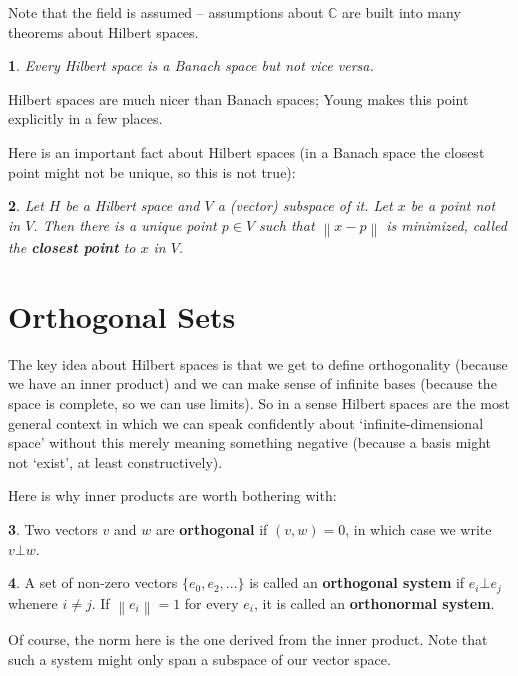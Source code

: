 \documentclass[oneside,english]{amsbook}
\numberwithin{section}{chapter}
\theoremstyle{plain}
\newtheorem{thm}{\protect\theoremname}
\theoremstyle{definition}
\newtheorem{defn}[thm]{\protect\definitionname}
\newcommand{\norm}[1]{\left\lVert#1\right\rVert}
\providecommand{\definitionname}{Definition}
\providecommand{\theoremname}{Theorem}
\begin{document}
Note that the field is assumed -- assumptions about $\mathbb{C}$ are built into many theorems about Hilbert spaces.

\begin{thm}
	Every Hilbert space is a Banach space but not \emph{vice versa}.
\end{thm}

Hilbert spaces are much nicer than Banach spaces; Young makes this point explicitly in a few places.

Here is an important fact about Hilbert spaces (in a Banach space the closest point might not be unique, so this is not true):

\begin{thm}
	Let $H$ be a Hilbert space and $V$ a (vector) subspace of it. Let $x$ be a point not in $V$. Then there is a unique point $p\in V$ such that $\norm{x - p}$ is minimized, called the \textbf{closest point} to $x$ in $V$.
\end{thm}

\section{Orthogonal Sets}

The key idea about Hilbert spaces is that we get to define orthogonality (because we have an inner product) and we can make sense of infinite bases (because the space is complete, so we can use limits). So in a sense Hilbert spaces are the most general context in which we can speak confidently about `infinite-dimensional space' without this merely meaning something negative (because a basis might not `exist', at least constructively).

Here is why inner products are worth bothering with:

\begin{defn}
	Two vectors $v$ and $w$ are \textbf{orthogonal} if $(v, w) = 0$, in which case we write $v\bot w$.
\end{defn}

\begin{defn}
	A set of non-zero vectors $\{e_0, e_2, ...\}$ is called an \textbf{orthogonal system} if $e_i\bot e_j$ whenere $i\ne j$. If $\norm{e_i} = 1$ for every $e_i$, it is called an \textbf{orthonormal system}.
\end{defn}

Of course, the norm here is the one derived from the inner product. Note that such a system might only span a subspace of our vector space.
\end{document}
